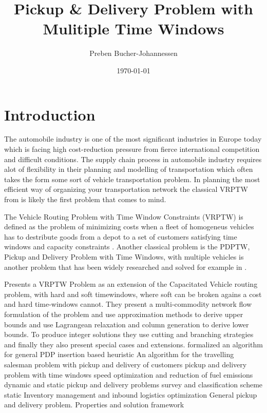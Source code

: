 \documentclass[a4paper,10pt]{article}
\begin{document}
\title{Pickup \& Delivery Problem with Mulitiple Time Windows}
\author{Preben Bucher-Johannessen}
\date{\today}
\maketitle

\tableofcontents
\newpage
{}

\section{Introduction}
The automobile industry is one of the most significant industries in Europe today which is facing high cost-reduction pressure from fierce international competition and difficult conditions.\cite{4flowWeb}
The supply chain process in automobile industry requires alot of flexibility in their planning and modelling of transportation which often takes the form some sort of vehicle transportation problem.
In planning the most efficient way of organizing your transportation network the classical VRPTW from is likely the first problem that comes to mind.

\cite{parragh08}
The Vehicle Routing Problem with Time Window Constraints (VRPTW) is defined as the problem of minimizing costs when a fleet of homogeneus vehicles has to destribute goods from a depot to a set of customers satisfying time windows and capacity constraints \cite{cordeau00}. 
Another classical problem is the PDPTW, Pickup and Delivery Problem with Time Windows, with multiple vehicles is another problem that has been widely researched and solved for example in \cite{nanry00}. 
\par

\cite{cordeau00} Presents a VRPTW Problem as an extension of the Capacitated Vehicle routing problem, with hard and soft timewindows, where soft can be broken agains a cost and hard time-windows cannot.
They present a multi-commodity network flow formulation of the problem and use approximation methods to derive upper bounds and use Lagrangean relaxation and column generation to derive lower bounds. 
To produce integer solutions they use cutting and branching strategies and finally they also present special cases and extensions. 
\cite{solomon87} formalized an algorithm for general PDP
\cite{lu06} insertion based heuristic
\cite{kalantari85} An algorithm for the travelling salesman problem with pickup and delivery of customers
\cite{dumas91} pickup and delivery problem with time windows
\cite{fagerholt10} speed optimization and reduction of fuel emissions
\cite{berbeglia10} dynamic and static pickup and delivery problems survey and classification scheme 
\cite{berbeglia07} static
\cite{zhou13} Inventory management and inbound logistics optimization
\cite{savelsbergh95} General pickup and delivery problem.
\cite{dror89} Properties and solution framework
\end{document}
